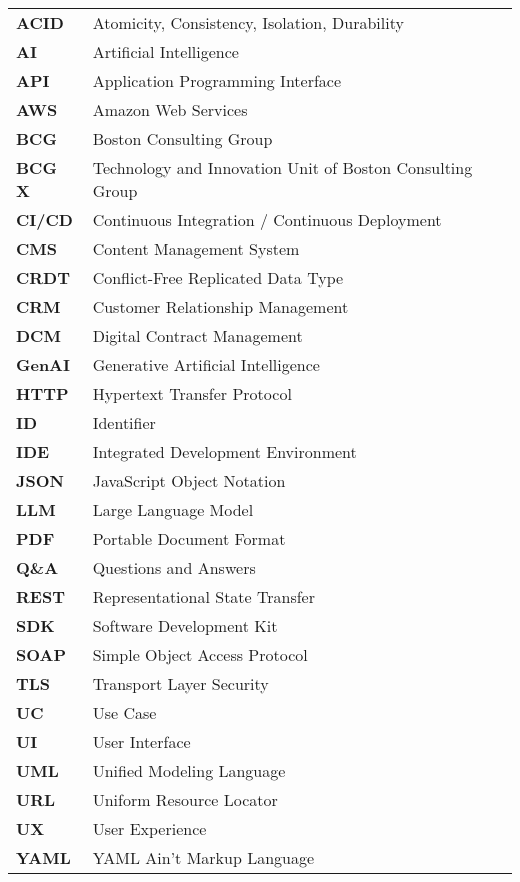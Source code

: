 \begin{longtable}{l l}
    \textbf{ACID} & Atomicity, Consistency, Isolation, Durability \\
    \textbf{AI} & Artificial Intelligence \\
    \textbf{API} & Application Programming Interface \\
    \textbf{AWS} & Amazon Web Services \\
    \textbf{BCG} & Boston Consulting Group \\
    \textbf{BCG X} & Technology and Innovation Unit of Boston Consulting Group \\
    \textbf{CI/CD} & Continuous Integration / Continuous Deployment \\
    \textbf{CMS} & Content Management System \\
    \textbf{CRDT} & Conflict-Free Replicated Data Type \\
    \textbf{CRM} & Customer Relationship Management \\
    \textbf{DCM} & Digital Contract Management \\
    \textbf{GenAI} & Generative Artificial Intelligence \\
    \textbf{HTTP} & Hypertext Transfer Protocol \\
    \textbf{ID} & Identifier \\
    \textbf{IDE} & Integrated Development Environment \\
    \textbf{JSON} & JavaScript Object Notation \\
    \textbf{LLM} & Large Language Model \\
    \textbf{PDF} & Portable Document Format \\
    \textbf{Q\&A} & Questions and Answers \\
    \textbf{REST} & Representational State Transfer \\
    \textbf{SDK} & Software Development Kit \\
    \textbf{SOAP} & Simple Object Access Protocol \\
    \textbf{TLS} & Transport Layer Security \\
    \textbf{UC} & Use Case \\
    \textbf{UI} & User Interface \\
    \textbf{UML} & Unified Modeling Language \\
    \textbf{URL} & Uniform Resource Locator \\
    \textbf{UX} & User Experience \\
    \textbf{YAML} & YAML Ain't Markup Language \\
\end{longtable}